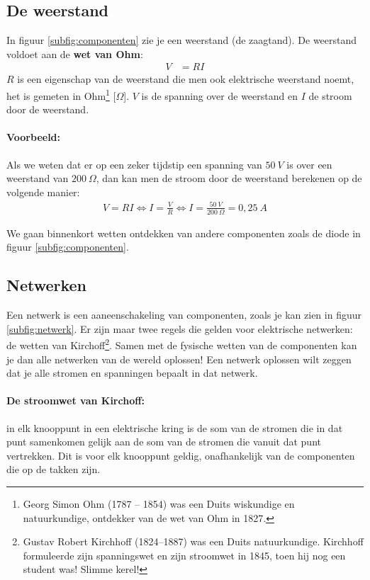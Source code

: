 \documentclass{article}
\begin{document}
\subsection{De weerstand}

In figuur \ref{subfig:componenten} zie je een weerstand (de zaagtand). De weerstand voldoet aan de \textbf{wet van Ohm}: 
\begin{align}
	V &= RI
\end{align} 
$R$ is een eigenschap van de  weerstand die men ook elektrische weerstand noemt, het is gemeten in Ohm\footnote{Georg Simon Ohm (1787 – 1854) was een Duits wiskundige en natuurkundige, ontdekker van de wet van Ohm in 1827.} [$\Omega$]. $V$ is de spanning over de weerstand en $I$ de stroom door de weerstand. 

\paragraph*{Voorbeeld:} Als we weten dat er op een zeker tijdstip een spanning van $50~V$ is over een weerstand van $200~\Omega$, dan kan men de stroom door de weerstand berekenen op de volgende manier:
\begin{align}
	V = RI \Leftrightarrow I = \frac{V}{R} \Leftrightarrow I = \frac{50~V}{200~\Omega}= 0,25~A
\end{align}

We gaan binnenkort wetten ontdekken van andere componenten zoals de diode in figuur \ref{subfig:componenten}.

\subsection{Netwerken}
Een netwerk is een aaneenschakeling van componenten, zoals je kan zien in figuur \ref{subfig:netwerk}. Er zijn maar twee regels die gelden voor elektrische netwerken: de wetten van Kirchoff\footnote{Gustav Robert Kirchhoff (1824–1887) was een Duits natuurkundige. Kirchhoff formuleerde zijn spanningswet en zijn stroomwet in 1845, toen hij nog een student was!  Slimme kerel!}. Samen met de fysische wetten van de componenten kan je dan alle netwerken van de wereld oplossen! Een netwerk oplossen wilt zeggen dat je alle stromen en spanningen bepaalt in dat netwerk.

\paragraph*{De stroomwet van Kirchoff:} in elk knooppunt in een elektrische kring is de som van de stromen die in dat punt samenkomen gelijk aan de som van de stromen die vanuit dat punt vertrekken. Dit is voor elk knooppunt geldig, onafhankelijk van de componenten die op de takken zijn. 
\end{document}
